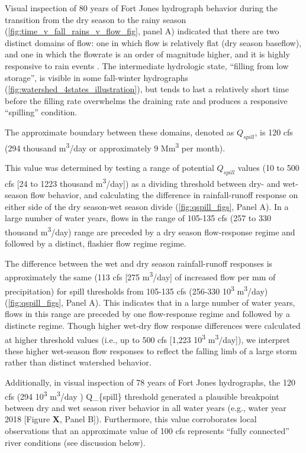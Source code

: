\documentclass[
]{article}
\begin{document}
Visual inspection of 80 years of Fort Jones hydrograph behavior during
the transition from the dry season to the rainy season
(\autoref{fig:time_v_fall_rains_v_flow_fig}, panel A) indicated that
there are two distinct domains of flow: one in which flow is relatively
flat (dry season baseflow), and one in which the flowrate is an order of
magnitude higher, and it is highly responsive to rain events . The
intermediate hydrologic state, ``filling from low storage'', is visible
in some fall-winter hydrographs
(\autoref{fig:watershed_4states_illustration}), but tends to last a
relatively short time before the filling rate overwhelms the draining
rate and produces a responsive ``spilling'' condition.

The approximate boundary between these domains, denoted as
\(Q_{spill}\), is 120 cfs (294 thousand m\textsuperscript{3}/day or
approximately 9 Mm\textsuperscript{3} per month).

This value was determined by testing a range of potential \(Q_{spill}\)
values (10 to 500 cfs {[}24 to 1223 thousand
m\textsuperscript{3}/day{]}) as a dividing threshold between dry- and
wet-season flow behavior, and calculating the difference in
rainfall-runoff response on either side of the dry season-wet season
divide (\autoref{fig:qspill_figs}, Panel A). In a large number of water
years, flows in the range of 105-135 cfs (257 to 330 thousand
m\textsuperscript{3}/day) range are preceded by a dry season
flow-response regime and followed by a distinct, flashier flow regime
regime.

The difference between the wet and dry season rainfall-runoff responses
is approximately the same (113 cfs {[}275 m\textsuperscript{3}/day{]} of
increased flow per mm of precipitation) for spill thresholds from
105-135 cfs (256-330 10\textsuperscript{3} m\textsuperscript{3}/day)
(\autoref{fig:qspill_figs}, Panel A). This indicates that in a large
number of water years, flows in this range are preceded by one
flow-response regime and followed by a distincte regime. Though higher
wet-dry flow response differences were calculated at higher threshold
values (i.e., up to 500 cfs {[}1,223 10\textsuperscript{3}
m\textsuperscript{3}/day{]}), we interpret these higher wet-season flow
responses to reflect the falling limb of a large storm rather than
distinct watershed behavior.

Additionally, in visual inspection of 78 years of Fort Jones
hydrographs, the 120 cfs (294 10\textsuperscript{3}
m\textsuperscript{3}/day ) Q\_\{spill\} threshold generated a plausible
breakpoint between dry and wet season river behavior in all water years
(e.g., water year 2018 {[}Figure \textbf{X}, Panel B{]}). Furthermore,
this value corroborates local observations that an approximate value of
100 cfs represents ``fully connected'' river conditions (see discussion
below).
\end{document}
